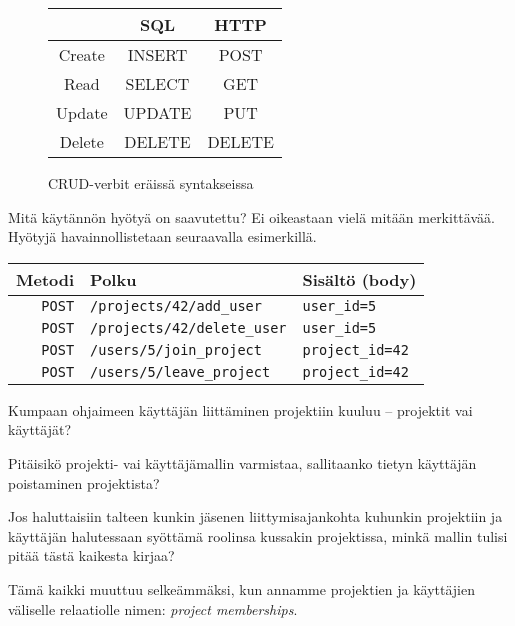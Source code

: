 \documentclass{article}
\newenvironment{myfigure}[1][tbp]{
  \begin{figure}[#1]
    \centering
    \begin{lrbox}{\myfigurebox}
      \begin{minipage}{\textwidth}
}{
      \end{minipage}
    \end{lrbox}
    \colorbox{blue!4}{\usebox{\myfigurebox}}
  \end{figure}
}
\newcommand{\pdfforeignlanguage}[2]{\texorpdfstring{\foreignlanguage{#1}{#2}}{#2}}
\newcommand{\eng}[1]{\pdfforeignlanguage{english}{#1}}
\begin{document}
\begin{myfigure}
\centering
\caption{CRUD-verbit eräissä syntakseissa}
\label{fig:crud}

\begin{tabular}{ccc}
       & SQL    & HTTP   \\
\hline
Create & INSERT & POST   \\
Read   & SELECT & GET    \\
Update & UPDATE & PUT    \\
Delete & DELETE & DELETE \\
\end{tabular}
\end{myfigure}

\begin{samepage}
Mitä käytännön hyötyä on saavutettu? Ei oikeastaan vielä mitään merkittävää.
Hyötyjä havainnollistetaan seuraavalla esimerkillä.

\begin{tabular}{rll}
Metodi      & Polku                           & Sisältö (\eng{body}) \\
\hline
\verb!POST! & \verb!/projects/42/add_user!    & \verb!user_id=5!     \\
\verb!POST! & \verb!/projects/42/delete_user! & \verb!user_id=5!     \\
\hline
\verb!POST! & \verb!/users/5/join_project!    & \verb!project_id=42! \\
\verb!POST! & \verb!/users/5/leave_project!   & \verb!project_id=42! \\
\end{tabular}
\end{samepage}

Kumpaan ohjaimeen käyttäjän liittäminen projektiin kuuluu -- projektit vai
käyttäjät?

Pitäisikö projekti- vai käyttäjämallin varmistaa, sallitaanko tietyn käyttäjän
poistaminen projektista?

Jos haluttaisiin talteen kunkin jäsenen liittymisajankohta kuhunkin projektiin
ja käyttäjän halutessaan syöttämä roolinsa kussakin projektissa, minkä mallin
tulisi pitää tästä kaikesta kirjaa?

Tämä kaikki muuttuu selkeämmäksi, kun annamme projektien ja käyttäjien
väliselle relaatiolle nimen: \emph{\eng{project memberships}}.
\end{document}
